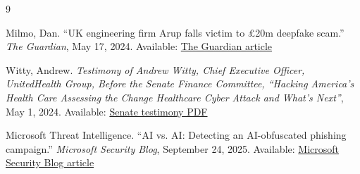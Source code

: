 \documentclass[11pt]{article}
\begin{document}
\begingroup
\renewcommand{\refname}{}
\begin{thebibliography}{9}

Milmo, Dan. ``UK engineering firm Arup falls victim to \pounds 20m deepfake scam.''
\textit{The Guardian}, May 17, 2024.
Available: \href{https://www.theguardian.com/technology/article/2024/may/17/uk-engineering-arup-deepfake-scam-hong-kong-ai-video}{The Guardian article}

Witty, Andrew.
\textit{Testimony of Andrew Witty, Chief Executive Officer, UnitedHealth Group, Before the Senate Finance Committee, ``Hacking America’s Health Care Assessing the Change Healthcare Cyber Attack and What’s Next''},
May 1, 2024.
Available: \href{https://www.finance.senate.gov/imo/media/doc/0501_witty_testimony.pdf}{Senate testimony PDF}

Microsoft Threat Intelligence. ``AI vs. AI: Detecting an AI-obfuscated phishing campaign.''
\textit{Microsoft Security Blog}, September 24, 2025.
Available: \href{https://www.microsoft.com/en-us/security/blog/2025/09/24/ai-vs-ai-detecting-an-ai-obfuscated-phishing-campaign/}{Microsoft Security Blog article}

\end{thebibliography}
\endgroup
\end{document}
